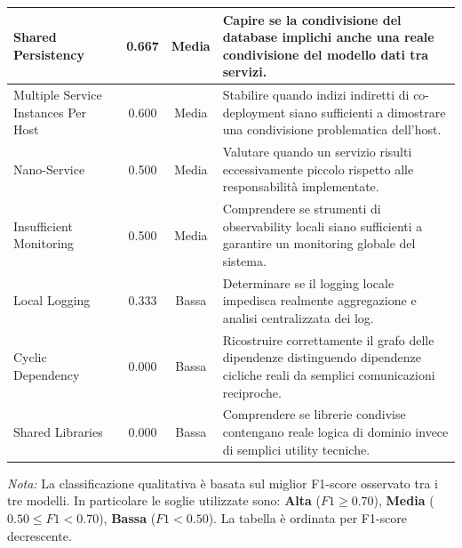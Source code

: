 \begin{table}[H]
\begin{tabular}{| >{\raggedright\arraybackslash}p{3.4cm} | c | c | >{\raggedright\arraybackslash}p{7.2cm} |}
Shared Persistency & 0.667 & Media & Capire se la condivisione del database implichi anche una reale condivisione del modello dati tra servizi. \\ \hline

Multiple Service Instances Per Host & 0.600 & Media & Stabilire quando indizi indiretti di co-deployment siano sufficienti a dimostrare una condivisione problematica dell’host. \\ \hline

Nano-Service & 0.500 & Media & Valutare quando un servizio risulti eccessivamente piccolo rispetto alle responsabilità implementate. \\ \hline

Insufficient Monitoring & 0.500 & Media & Comprendere se strumenti di observability locali siano sufficienti a garantire un monitoring globale del sistema. \\ \hline

Local Logging & 0.333 & Bassa & Determinare se il logging locale impedisca realmente aggregazione e analisi centralizzata dei log. \\ \hline

Cyclic Dependency & 0.000 & Bassa & Ricostruire correttamente il grafo delle dipendenze distinguendo dipendenze cicliche reali da semplici comunicazioni reciproche. \\ \hline

Shared Libraries & 0.000 & Bassa & Comprendere se librerie condivise contengano reale logica di dominio invece di semplici utility tecniche. \\ \hline

\end{tabular}

\vspace{0.4em}
\begin{minipage}{0.98\textwidth}
\footnotesize
\textit{Nota:} La classificazione qualitativa è basata sul miglior F1-score osservato tra i tre modelli. In particolare le soglie utilizzate sono: \textbf{Alta} ($F1 \geq 0.70$), \textbf{Media} ($0.50 \leq F1 < 0.70$), \textbf{Bassa} ($F1 < 0.50$). La tabella è ordinata per F1-score decrescente.
\end{minipage}
\end{table}




